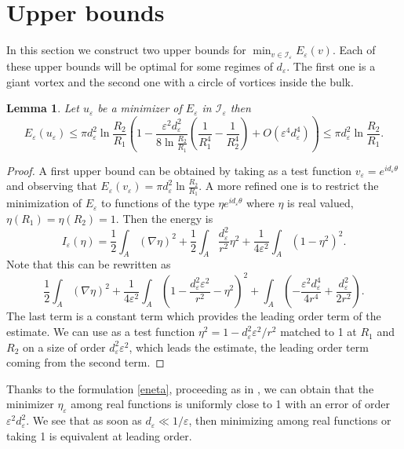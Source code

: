 \documentclass[12pt,reqno]{amsart}
\newtheorem{lemma}[theorem]{Lemma}
\def\I{{\mathcal I}}
\def\e {{\varepsilon}}
\numberwithin{equation}{section}
\begin{document}
\section{Upper bounds}\label{sec:upper_Bound}

In this section we construct two upper bounds for \(\min_{v\in \I_\e} E_\e(v)\). Each of these upper bounds will be optimal for some regimes of \(d_\e\). The first one is a giant vortex and the second one with a circle of vortices inside the bulk.

\begin{lemma}\label{lem:1st_upper_bound}
Let \(u_\e\) be a minimizer of \(E_\e\) in \(\I_\e\) then 
$$ E_\e(u_\e)\leq  \pi d_\e^2\ln \frac{R_2}{R_1}\left(1-\frac {\e^2d_\e^2}{8\ln \frac{R_2}{R_1}}\left (\frac 1 {R_1^4}- \frac 1 {R_2^4} \right )+O(\e^4 d_\e^4)\right) \leq \pi d_\e^2\ln \frac{R_2}{R_1}.$$
\end{lemma}

\begin{proof} A first upper bound can be obtained by taking as a test function \(v_\e=e^{id_\e \theta}\) and observing that \(E_\e(v_\e)= \pi d_\e^2\ln \frac{R_2}{R_1}\). A more refined one is to restrict the  minimization of  \(E_\e\) to functions of the type $\eta e^{id_\e \theta}$ where $\eta$ is real valued, $\eta(R_1)=\eta(R_2)=1$. Then the energy is 
\begin{equation}\label{eq:energy_eta}
I_\e (\eta) =\frac12 \int_A (\nabla \eta)^2+\frac12 \int_A \frac{d_\e^2}{r^2} \eta^2+\frac{1}{4\e^2}\int_A (1-\eta^2)^2.
\end{equation}
Note that this can be rewritten as
\begin{equation}\label{eneta}
  \frac12 \int_A (\nabla \eta)^2+\frac{1}{4\e^2}\int_A \left (1-\frac{d_\e^2\e^2}{r^2}-\eta^2\right )^2 +  \int_A \left (-\frac{\e^2d_\e^4}{4r^4}+\frac{d_\e^2}{2r^2} \right ) .
\end{equation} The last term is a constant term which provides the leading order term of the estimate.
 We can use  as a test function $\eta^2=1-d_\e^2 \e^2/r^2$ matched to 1 at $R_1$ and $R_2$ on a size of order $d_\e^2 \e^2$, which leads the estimate, the leading order term coming from the second term. 
\end{proof} 
Thanks to the formulation \eqref{eneta}, proceeding as in \cite{Aftalion_2006}, we can obtain that the minimizer $\eta_\e$ among real functions is uniformly close to 1 with an error of order $\e^2 d_\e^2$. We see that as soon as $d_\e\ll 1/\e$, then minimizing among real functions or taking 1 is equivalent at leading order.
\end{document}
